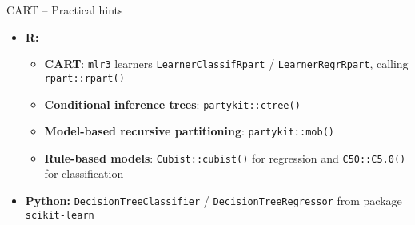 \begin{frame}{CART -- Practical hints}

\begin{itemize}
  \item \textbf{R:}
  \begin{itemize}
      \item \textbf{CART}: \texttt{mlr3} learners \texttt{LearnerClassifRpart} / 
    \texttt{LearnerRegrRpart}, calling \texttt{rpart::rpart()}
    \item \textbf{Conditional inference trees}: \texttt{partykit::ctree()}
    \item \textbf{Model-based recursive partitioning}: \texttt{partykit::mob()}
    \item \textbf{Rule-based models}: \texttt{Cubist::cubist()} for regression and \texttt{C50::C5.0()} for classification
  \end{itemize}
  \item \textbf{Python:} \texttt{DecisionTreeClassifier} / 
  \texttt{DecisionTreeRegressor} from package \texttt{scikit-learn}
\end{itemize}

\end{frame}

